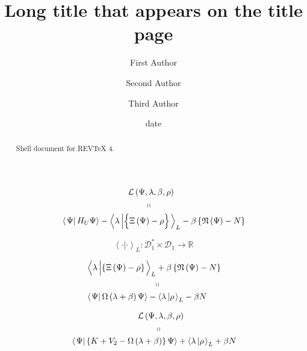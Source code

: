 \documentclass[aps,preprint]{revtex4}%
\begin{document}
\title[Short title for running header]{Long title that appears on the title page}
\author{First Author}
\author{Second Author}
\author{Third Author}

\begin{abstract}
Shell document for REV\TeX{} 4.

\end{abstract}
\date[Date text]{date}




\maketitle
\tableofcontents
%

\begin{align*}
&  \qquad\qquad\qquad\qquad\mathcal{L}\left(  \Psi,\lambda,\beta,\rho\right)
\\
&  \qquad\qquad\qquad\qquad\qquad\left.  \shortparallel\right. \\
&  \left\langle \left.  \Psi\right\vert H_{U}\Psi\right\rangle -\left\langle
\lambda\left\vert \left\{  \overset{}{\Xi\left(  \Psi\right)  -\rho}\right\}
\right.  \right\rangle _{L}-\beta\left\{  \mathfrak{N}\left(  \Psi\right)
-N\right\}
\end{align*}
%

\[
\left\langle \cdot|\cdot\right\rangle _{L}:\mathcal{D}_{1}^{\ast}%
\times\mathcal{D}_{1}\rightarrow\mathbb{R}%
\]
%

\begin{align*}
&  \left\langle \lambda\left\vert \overset{}{\left\{  \Xi\left(  \Psi\right)
-\rho\right\}  }\right.  \right\rangle _{L}+\beta\left\{  \mathfrak{N}\left(
\Psi\right)  -N\right\} \\
&  \qquad\qquad\qquad\qquad\left.  \shortparallel\right. \\
&  \left\langle \left.  \Psi\right\vert \Omega\left(  \lambda+\beta\right)
\Psi\right\rangle -\left\langle \lambda\left\vert \rho\right.  \right\rangle
_{L}-\beta N
\end{align*}
%

\begin{align*}
&  \qquad\qquad\qquad\qquad\mathcal{L}\left(  \Psi,\lambda,\beta,\rho\right)
\\
&  \qquad\qquad\qquad\qquad\qquad\left.  \shortparallel\right. \\
&  \left\langle \left.  \Psi\right\vert \left\{  K+V_{2}-\Omega\left(
\lambda+\beta\right)  \right\}  \Psi\right\rangle +\left\langle \lambda
\left\vert \rho\right.  \right\rangle _{L}+\beta N
\end{align*}
%
\end{document}

